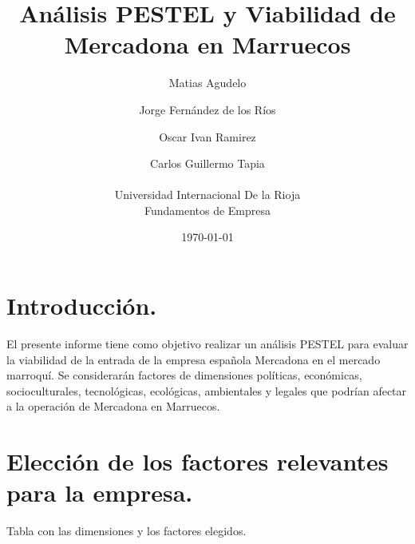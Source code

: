 \documentclass{article}  %
\title{Análisis PESTEL y Viabilidad de Mercadona en Marruecos}  %
\author{
Matias Agudelo\and
Jorge Fernández de los Ríos\and
Oscar Ivan Ramirez\and
Carlos Guillermo Tapia
\\
\\
Universidad Internacional De la Rioja\\
 Fundamentos de Empresa
}  %
\date{\today}  %
\begin{document}

\maketitle  %

\section{Introducción.} %

El presente informe tiene como objetivo realizar un análisis PESTEL para evaluar la viabilidad de la entrada de la empresa española Mercadona en el mercado marroquí. Se considerarán factores de dimensiones políticas, económicas, socioculturales, tecnológicas, ecológicas, ambientales y legales que podrían afectar a la operación de Mercadona en Marruecos.

\section{Elección de los factores relevantes para la empresa.} %

\label{elecciuxf3n-de-los-factores-relevantes-para-la-empresa.}

Tabla con las dimensiones y los factores elegidos.
\end{document}
